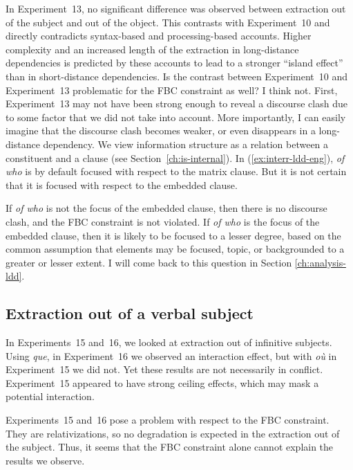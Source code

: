 In Experiment~13, no significant difference was observed between extraction out of the subject and out of the object. This contrasts with Experiment~10 and directly contradicts syntax-based and processing-based accounts. Higher complexity and an increased length of the extraction in long-distance dependencies is predicted by these accounts to lead to a stronger ``island effect'' than in short-distance dependencies. 
Is the contrast between Experiment~10 and Experiment~13 problematic for the FBC constraint as well?  I think not. First, Experiment~13 may not have been strong enough to reveal a discourse clash due to some factor that we did not take into account. More importantly, I can easily imagine that the discourse clash becomes weaker, or even disappears in a long-distance dependency. We view information structure as a relation between a constituent and a clause (see Section~\ref{ch:is-internal}). In (\ref{ex:interr-ldd-eng}), \emph{of who} is by default focused with respect to the matrix clause. But it is not certain that it is focused with respect to the embedded clause. 

\label{ex:interr-ldd-eng}
\z 

If \emph{of who} is not the focus of the embedded clause, then there is no discourse clash, and the FBC constraint is not violated. If \emph{of who} is the focus of the embedded clause, then it is likely to be focused to a lesser degree, based on the common assumption that elements may be focused, topic, or backgrounded to a greater or lesser extent. I will come back to this question in Section \ref{ch:analysis-ldd}. 


\subsection{Extraction out of a verbal subject}
\label{ch:exp-conclusion-CP-subject}

In Experiments~15 and~16, we looked at extraction out of infinitive subjects. Using \emph{que}, in Experiment~16 we observed an interaction effect, but with \emph{où} in  Experiment~15 we did not. Yet these results are not necessarily in conflict. Experiment~15 appeared to have strong ceiling effects, which may mask a potential interaction. 

Experiments~15 and~16 pose a problem with respect to the FBC constraint. They are relativizations, so no degradation is expected in the extraction out of the subject. Thus, it seems that the FBC constraint alone cannot explain the results we observe.

